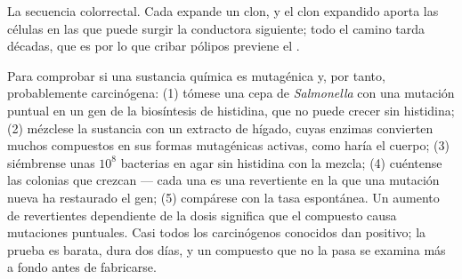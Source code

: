 \begin{omfigure}

{\small La secuencia colorrectal. Cada  expande un
clon, y el clon expandido aporta las células en las que puede surgir la
conductora siguiente; todo el camino tarda décadas, que es por lo que
cribar pólipos previene el .}
\end{omfigure}

\begin{method}\label{met:b3:cancer-biology:ames}
Para comprobar si una sustancia química es mutagénica y, por tanto,
probablemente carcinógena: (1) tómese una cepa de \emph{Salmonella} con
una mutación puntual en un gen de la biosíntesis de histidina, que no
puede crecer sin histidina; (2) mézclese la sustancia con un extracto de
hígado, cuyas enzimas convierten muchos compuestos en sus formas
mutagénicas activas, como haría el cuerpo; (3) siémbrense unas $10^{8}$
bacterias en agar sin histidina con la mezcla; (4) cuéntense las colonias
que crezcan --- cada una es una revertiente en la que una mutación nueva
ha restaurado el gen; (5) compárese con la tasa espontánea. Un aumento de
revertientes dependiente de la dosis significa que el compuesto causa
mutaciones puntuales. Casi todos los carcinógenos conocidos dan positivo;
la prueba es barata, dura dos días, y un compuesto que no la pasa se
examina más a fondo antes de fabricarse.
\end{method}

